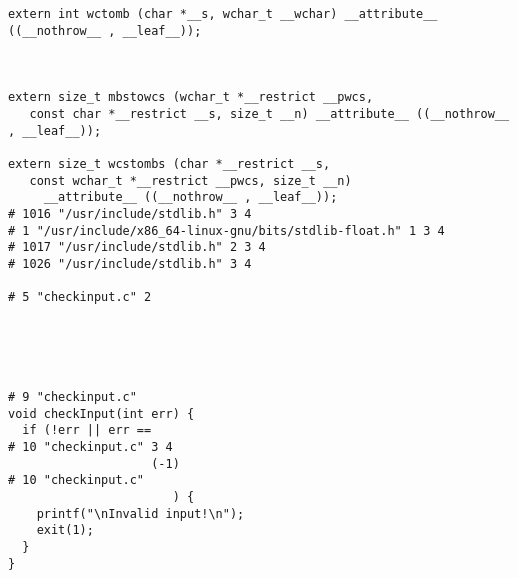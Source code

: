 \documentclass[11pt]{article}
\begin{document}
\begin{enumerate}
\begin{verbatim}
extern int wctomb (char *__s, wchar_t __wchar) __attribute__ ((__nothrow__ , __leaf__));



extern size_t mbstowcs (wchar_t *__restrict __pwcs,
   const char *__restrict __s, size_t __n) __attribute__ ((__nothrow__ , __leaf__));

extern size_t wcstombs (char *__restrict __s,
   const wchar_t *__restrict __pwcs, size_t __n)
     __attribute__ ((__nothrow__ , __leaf__));
# 1016 "/usr/include/stdlib.h" 3 4
# 1 "/usr/include/x86_64-linux-gnu/bits/stdlib-float.h" 1 3 4
# 1017 "/usr/include/stdlib.h" 2 3 4
# 1026 "/usr/include/stdlib.h" 3 4

# 5 "checkinput.c" 2





# 9 "checkinput.c"
void checkInput(int err) {
  if (!err || err == 
# 10 "checkinput.c" 3 4
                    (-1)
# 10 "checkinput.c"
                       ) {
    printf("\nInvalid input!\n");
    exit(1);
  }
}
\end{verbatim}
\end{enumerate}
\end{document}
